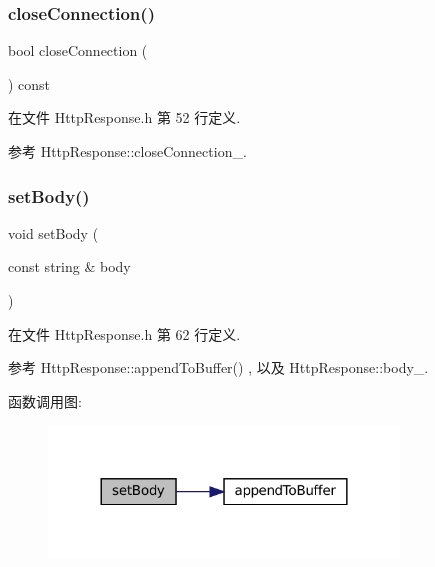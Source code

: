 \subsubsection{\texorpdfstring{close\+Connection()}{closeConnection()}}
{\footnotesize\ttfamily bool close\+Connection (\begin{DoxyParamCaption}{ }\end{DoxyParamCaption}) const\hspace{0.3cm}{\ttfamily [inline]}}



在文件 Http\+Response.\+h 第 52 行定义.



参考 Http\+Response\+::close\+Connection\+\_\+.

\mbox{\label{classmuduo_1_1net_1_1HttpResponse_a8c51abf32832a62b037331cfa6d762cb}} 
\subsubsection{\texorpdfstring{set\+Body()}{setBody()}}
{\footnotesize\ttfamily void set\+Body (\begin{DoxyParamCaption}\item[{const string \&}]{body }\end{DoxyParamCaption})\hspace{0.3cm}{\ttfamily [inline]}}



在文件 Http\+Response.\+h 第 62 行定义.



参考 Http\+Response\+::append\+To\+Buffer() , 以及 Http\+Response\+::body\+\_\+.

函数调用图\+:
\nopagebreak
\begin{figure}[H]
\begin{center}
\leavevmode
\includegraphics[width=264pt]{classmuduo_1_1net_1_1HttpResponse_a8c51abf32832a62b037331cfa6d762cb_cgraph}
\end{center}
\end{figure}
\mbox{\label{classmuduo_1_1net_1_1HttpResponse_a8edbcd81fcbbafb46b9d95f56d2a6567}} 
